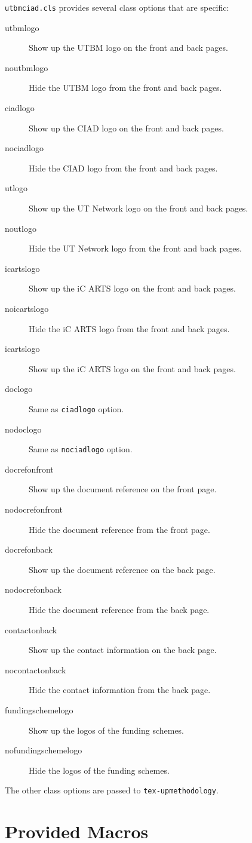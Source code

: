 \documentclass[article]{upmethodology-document}
\begin{document}
\texttt{utbmciad.cls} provides several class options that are specific:
\begin{description}
\item[utbmlogo] Show up the UTBM logo on the front and back pages.
\item[noutbmlogo] Hide the UTBM logo from the front and back pages.
\item[ciadlogo] Show up the CIAD logo on the front and back pages.
\item[nociadlogo] Hide the CIAD logo from the front and back pages.
\item[utlogo] Show up the UT Network logo on the front and back pages.
\item[noutlogo] Hide the UT Network logo from the front and back pages.
\item[icartslogo] Show up the iC ARTS logo on the front and back pages.
\item[noicartslogo] Hide the iC ARTS logo from the front and back pages.
\item[icartslogo] Show up the iC ARTS logo on the front and back pages.
\item[doclogo] Same as \texttt{ciadlogo} option.
\item[nodoclogo] Same as \texttt{nociadlogo} option.
\item[docrefonfront] Show up the document reference on the front page.
\item[nodocrefonfront] Hide the document reference from the front page.
\item[docrefonback] Show up the document reference on the back page.
\item[nodocrefonback] Hide the document reference from the back page.
\item[contactonback] Show up the contact information on the back page.
\item[nocontactonback] Hide the contact information from the back page.
\item[fundingschemelogo] Show up the logos of the funding schemes.
\item[nofundingschemelogo] Hide the logos of the funding schemes.
\end{description}

The other class options are passed to \texttt{tex-upmethodology}.

\section{Provided Macros}
\end{document}

